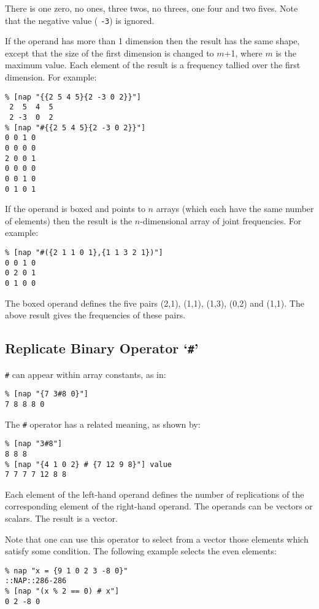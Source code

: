   \par There is one zero, no ones, three twos, no threes, one four and
  two fives. Note that the negative value (
  \texttt{-3}) is ignored.
  \par If the operand has more than 1 dimension then the result has the
  same shape, except that the size of the first dimension is changed to
  $m$+1, where 
  $m$ is the maximum value. Each element of the result is a
  frequency tallied over the first dimension. For example:
  \begin{verbatim}
% [nap "{{2 5 4 5}{2 -3 0 2}}"]
 2  5  4  5
 2 -3  0  2
% [nap "#{{2 5 4 5}{2 -3 0 2}}"]
0 0 1 0
0 0 0 0
2 0 0 1
0 0 0 0
0 0 1 0
0 1 0 1
\end{verbatim}

  \par If the operand is boxed and points to 
  $n$ arrays (which each have the same number of elements)
  then the result is the 
  $n$-dimensional array of joint frequencies. For example:
  \begin{verbatim}
% [nap "#({2 1 1 0 1},{1 1 3 2 1})"]
0 0 1 0
0 2 0 1
0 1 0 0
\end{verbatim}

  \par The boxed operand defines the five pairs (2,1), (1,1), (1,3),
  (0,2) and (1,1). The above result gives the frequencies of these
  pairs.
  \subsection{
    \label{Replicate}Replicate Binary Operator `\texttt{\#}'
  }

  \par 
  \texttt{\#} can appear within array constants, as in:
  \begin{verbatim}
% [nap "{7 3#8 0}"]
7 8 8 8 0
\end{verbatim}

  \par The 
  \texttt{\#} operator has a related meaning, as shown by:
  \begin{verbatim}
% [nap "3#8"]
8 8 8
% [nap "{4 1 0 2} # {7 12 9 8}"] value
7 7 7 7 12 8 8
\end{verbatim}

  \par Each element of the left-hand operand defines the number of
  replications of the corresponding element of the right-hand operand.
  The operands can be vectors or scalars. The result is a vector.
  \par Note that one can use this operator to select from a vector those
  elements which satisfy some condition. The following example selects
  the even elements:
  \begin{verbatim}
% nap "x = {9 1 0 2 3 -8 0}"
::NAP::286-286
% [nap "(x % 2 == 0) # x"]
0 2 -8 0
\end{verbatim}

